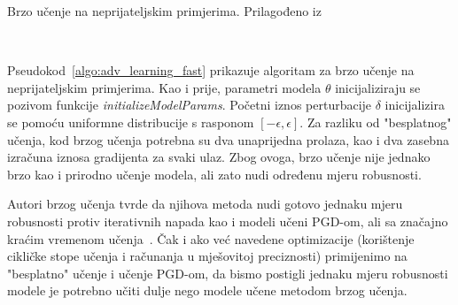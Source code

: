 \documentclass[times, utf8, zavrsni, numeric]{fer}
\newcommand{\pluseq}{\mathrel{+}=}
\begin{document}
\pagebreak

\begin{algorithm}
    \caption{Brzo učenje na neprijateljskim primjerima. Prilagođeno iz~\cite{wong2020fast}}
    \label{algo:adv_learning_fast}
    \begin{algorithmic}
        \\\hrulefill
                \STATE{$grad \pluseq \nabla_{\theta}L(x_{i} + \delta,y_{i};\theta)$}
            \ENDFOR
        \ENDFOR
    \end{algorithmic}
\end{algorithm}

Pseudokod~\ref{algo:adv_learning_fast} prikazuje algoritam za brzo učenje na neprijateljskim primjerima.
Kao i prije, parametri modela $\theta$ inicijaliziraju se pozivom funkcije \textit{initializeModelParams}.
Početni iznos perturbacije $\delta$ inicijalizira se pomoću uniformne distribucije s rasponom $[-\epsilon, \epsilon]$.
Za razliku od "besplatnog" učenja, kod brzog učenja potrebna su dva unaprijedna prolaza, kao i dva zasebna izračuna iznosa gradijenta za svaki ulaz.
Zbog ovoga, brzo učenje nije jednako brzo kao i prirodno učenje modela, ali zato nudi određenu mjeru robusnosti.

Autori brzog učenja tvrde da njihova metoda nudi gotovo jednaku mjeru robusnosti protiv iterativnih napada kao i modeli učeni PGD-om, 
ali sa značajno kraćim vremenom učenja~\cite{wong2020fast}. Čak i ako već navedene optimizacije (korištenje cikličke stope učenja i računanja u mješovitoj preciznosti) primijenimo na "besplatno" učenje i učenje PGD-om, 
da bismo postigli jednaku mjeru robusnosti modele je potrebno učiti dulje nego modele učene metodom brzog učenja.

\pagebreak
\end{document}
